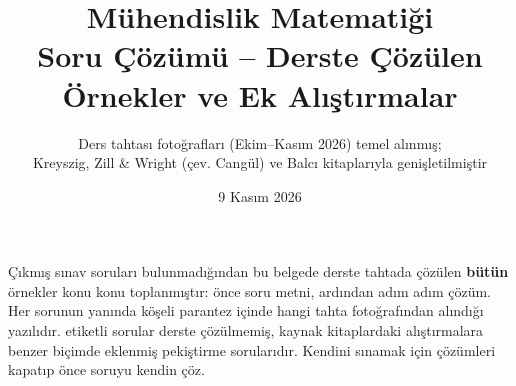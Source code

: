 \documentclass[11pt]{article}
\title{\color{ana}\textbf{Mühendislik Matematiği}\\[4pt]\Large Soru Çözümü -- Derste Çözülen Örnekler ve Ek Alıştırmalar}
\author{Ders tahtası fotoğrafları (Ekim--Kasım 2026) temel alınmış;\\ Kreyszig, Zill \& Wright (çev. Cangül) ve Balcı kitaplarıyla genişletilmiştir}
\date{9 Kasım 2026}
\begin{document}
\maketitle
\thispagestyle{empty}
\begin{bilgi}
Çıkmış sınav soruları bulunmadığından bu belgede derste tahtada çözülen \textbf{bütün} örnekler konu konu toplanmıştır: önce soru metni, ardından adım adım çözüm. Her sorunun yanında köşeli parantez içinde hangi tahta fotoğrafından alındığı yazılıdır. \ekal etiketli sorular derste çözülmemiş, kaynak kitaplardaki alıştırmalara benzer biçimde eklenmiş pekiştirme sorularıdır. Kendini sınamak için çözümleri kapatıp önce soruyu kendin çöz.
\end{bilgi}
\tableofcontents
\clearpage
\clearpage
\clearpage
\clearpage
\clearpage
\clearpage
\end{document}
